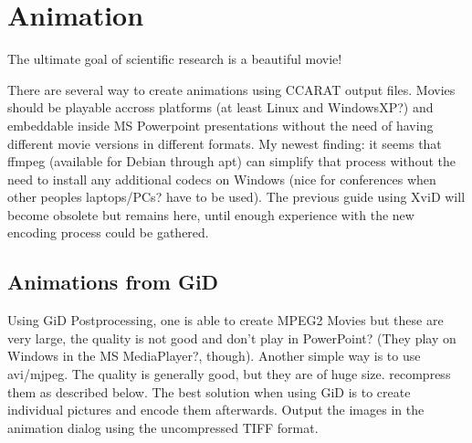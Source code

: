 
\makeatletter
\newenvironment{lyxcode}
{\begin{list}{}{
\setlength{\rightmargin}{\leftmargin}
\setlength{\listparindent}{0pt}%
\raggedright
\setlength{\itemsep}{0pt}
\setlength{\parsep}{0pt}
\normalfont\ttfamily}%
 \item[]}
{\end{list}}
\newenvironment{lyxlist}[1]
{\begin{list}{}
{\settowidth{\labelwidth}{#1}
 \setlength{\leftmargin}{\labelwidth}
 \addtolength{\leftmargin}{\labelsep}
 \renewcommand{\makelabel}[1]{##1\hfil}}}
{\end{list}}

\makeatother

\newcommand{\gauss}{{\tt gauss}}


\chapter{Animation}

 
The ultimate goal of scientific research is a beautiful movie!

There are several way to create animations using CCARAT output
files. Movies should be playable accross platforms (at least Linux and
WindowsXP?) and embeddable inside MS Powerpoint presentations without
the need of having different movie versions in different formats. My
newest finding: it seems that ffmpeg (available for Debian through
apt) can simplify that process without the need to install any
additional codecs on Windows (nice for conferences when other peoples
laptops/PCs? have to be used). The previous guide using XviD will
become obsolete but remains here, until enough experience with the new
encoding process could be gathered.

\section{Animations from GiD}

 Using GiD Postprocessing, one is able to create MPEG2 Movies but
 these are very large, the quality is not good and don't play in
 PowerPoint? (They play on Windows in the MS MediaPlayer?,
 though). Another simple way is to use avi/mjpeg. The quality is
 generally good, but they are of huge size. recompress them as
 described below. The best solution when using GiD is to create
 individual pictures and encode them afterwards. Output the images in
 the animation dialog using the uncompressed TIFF format.

